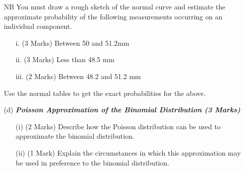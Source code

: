 \documentclass[]{article}
\begin{document}
\begin{itemize}
NB 	You must draw a rough sketch of the normal curve and estimate the approximate probability of the following measurements occurring on an individual component.
\begin{itemize}
\item [i.](3 Marks)	Between 50 and 51.2mm
\item [ii.](3 Marks) Less than 48.5 mm
\item [iii.](2 Marks) Between 48.2 and 51.2 mm
\end{itemize}

Use the normal tables to get the exact probabilities for the above.
						
	
\item[(d)] \textbf{\textit{Poisson Approximation of the Binomial Distribution (3 Marks)}}
\begin{itemize}
\item[(i)] (2 Marks) Describe how the Poisson distribution can be used to approximate the binomial distribution.
\item[(ii)] (1 Mark) Explain the circumstances in which this approximation may be used in preference to the binomial distribution.
\end{itemize}	
	
\end{itemize}						
\end{document}
